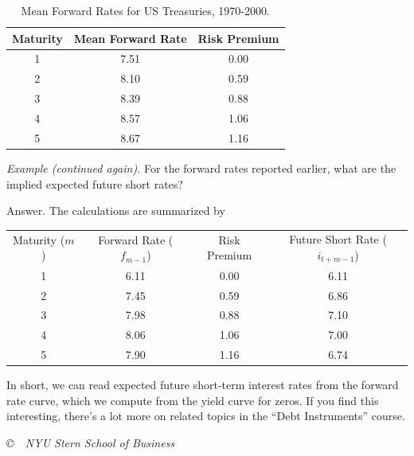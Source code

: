 \documentclass[letterpaper,12pt]{article}
\begin{document}
\begin{table}[h]
\centering
\begin{tabular}{ccc}
\toprule
        Maturity   &    Mean Forward Rate   &  Risk Premium \\
\midrule
            1  &  7.51 &  0.00 \\
            2  &  8.10 &  0.59 \\
            3  &  8.39 &  0.88 \\
            4  &  8.57 &  1.06 \\
            5  &  8.67 &  1.16  \\
\bottomrule
\end{tabular}
\caption{Mean Forward Rates for US Treasuries, 1970-2000.}
\label{tab:meanrates}
\end{table}

{\it Example (continued again).\/} For the forward rates reported
earlier, what are the implied expected future short rates?

Answer.  The calculations are summarized by
%
\begin{center}
\begin{tabular}{cccc}
  Maturity ($m$) & Forward Rate ($f_{m-1}$) & Risk Premium & Future Short Rate ($i_{t+m-1}$) \\
     1      &   6.11       &    0.00      &    6.11 \\
     2      &   7.45       &    0.59      &    6.86  \\
     3      &   7.98       &    0.88      &    7.10  \\
     4      &   8.06       &    1.06      &    7.00  \\
     5      &   7.90       &    1.16      &    6.74
\end{tabular}
\end{center}
%

In short, we can read expected future short-term interest rates
from the forward rate curve, which we compute from the yield curve
for zeros.  If you find this interesting, there's a lot more on
related topics in the ``Debt Instruments'' course.

\vfill \centerline{\it \copyright \ \number\year \  NYU Stern
School of Business}
\end{document}
